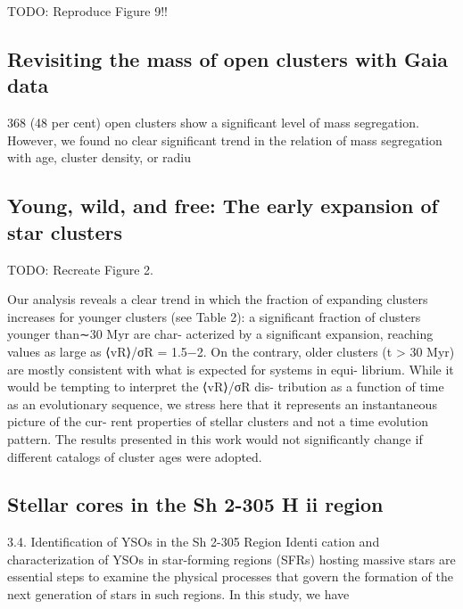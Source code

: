 \documentclass[../main.tex]{subfiles}
\begin{document}
{TODO: Reproduce Figure 9!!

\subsection{Revisiting the mass of open clusters with Gaia data}



368 (48
per cent) open clusters show a significant level of mass segregation.
However, we found no clear significant trend in the relation of mass
segregation with age, cluster density, or radiu
\subsection{Young, wild, and free: The early expansion of star clusters}
TODO: Recreate Figure 2.

Our analysis reveals a clear trend in which the fraction of
expanding clusters increases for younger clusters (see Table 2):
a significant fraction of clusters younger than∼30 Myr are char-
acterized by a significant expansion, reaching values as large as
⟨vR⟩/σR = 1.5−2. On the contrary, older clusters (t > 30 Myr)
are mostly consistent with what is expected for systems in equi-
librium. While it would be tempting to interpret the ⟨vR⟩/σR dis-
tribution as a function of time as an evolutionary sequence, we
stress here that it represents an instantaneous picture of the cur-
rent properties of stellar clusters and not a time evolution pattern.
The results presented in this work would not significantly change
if diﬀerent catalogs of cluster ages were adopted.


\subsection{Stellar cores in the Sh 2-305 H ii region}


3.4. Identification of YSOs in the Sh 2-305 Region
Identi cation and characterization of YSOs in star-forming
regions (SFRs) hosting massive stars are essential steps to
examine the physical processes that govern the formation of the
next generation of stars in such regions. In this study, we have

}
\end{document}
